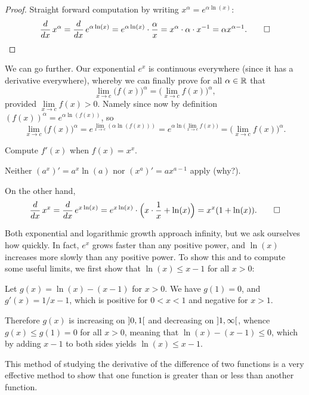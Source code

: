 \begin{proof}
	Straight forward computation by writing $x^\alpha = e^{\alpha \ln(x)}$:
	\[
		\frac{d}{d x} \, x^\alpha = \frac{d}{d x} \, e^{\alpha \ln(x)} = e^{\alpha \ln(x)} \cdot \frac{\alpha}{x} = x^\alpha \cdot \alpha \cdot x^{-1} = \alpha x^{\alpha - 1}.\qedhere
	\]
\end{proof}

\noindent
We can go further.
Our exponential $e^x$ is continuous everywhere (since it has a derivative everywhere), whereby we can finally prove for all $\alpha \in \mathbb{R}$ that
\[
	\lim_{x \to c} \big ( f(x) \big )^\alpha = \Big ( \lim_{x \to c} f(x) \Big )^\alpha,
\]
provided $\lim\limits_{x \to c} f(x) > 0$.
Namely since now by definition $(f(x))^\alpha = e^{\alpha \ln(f(x))}$, so
\[
	\lim_{x \to c} \big ( f(x) \big )^\alpha = e^{\lim\limits_{x \to c} (\alpha \ln(f(x)))} = e^{\alpha \ln \big ( \lim\limits_{x \to c} f(x) \big )} = \Big ( \lim_{x \to c} f(x) \Big )^\alpha.
\]

\begin{example}
	Compute $f'(x)$ when $f(x) = x^x$.

	Neither $(a^x)' = a^x \ln(a)$ nor $(x^a)' = a x^{a - 1}$ apply (why?).

	On the other hand,
	\[
		\frac{d}{d x} \, x^x = \frac{d}{d x} \, e^{x \ln(x)} = e^{x \ln(x)} \cdot \Big ( x \cdot \frac{1}{x} + \ln(x) \Big ) = x^x (1 + \ln(x)). \qedhere
	\]
\end{example}


Both exponential and logarithmic growth approach infinity, but we ask ourselves how quickly.
In fact, $e^x$ grows faster than any positive power, and $\ln(x)$ increases more slowly than any positive power. To show this and to compute some useful limits, we first show that $\ln(x) \leq x - 1$ for all $x > 0$:

Let $g(x) = \ln(x) - (x - 1)$ for $x > 0$.
We have $g(1) = 0$, and $g'(x) = 1/x - 1$, which is positive for $0 < x < 1$ and negative for $x > 1$.

Therefore $g(x)$ is increasing on $\interval[open]{0}{1}$ and decreasing on $\interval[open]{1}{\infty}$, whence $g(x) \leq g(1) = 0$ for all $x > 0$, meaning that $\ln(x) - (x - 1) \leq 0$, which by adding $x - 1$ to both sides yields $\ln(x) \leq x - 1$.

This method of studying the derivative of the difference of two functions is a very effective method to show that one function is greater than or less than another function.

